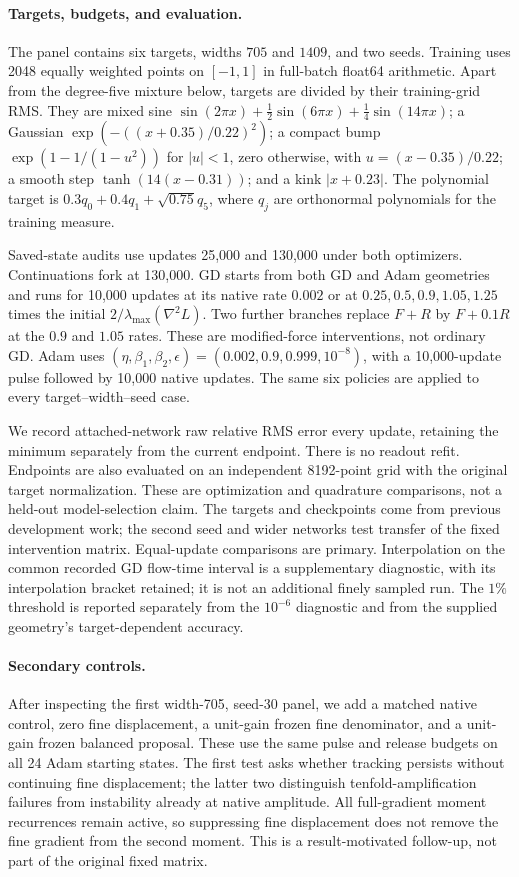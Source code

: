 \paragraph{Targets, budgets, and evaluation.}
The panel contains six targets, widths $705$ and $1409$, and two seeds.
Training uses 2048 equally weighted points on $[-1,1]$ in full-batch
float64 arithmetic. Apart from the degree-five mixture below, targets
are divided by their training-grid RMS. They are mixed sine
$\sin(2\pi x)+\tfrac12\sin(6\pi x)+\tfrac14\sin(14\pi x)$;
a Gaussian $\exp(-((x+0.35)/0.22)^2)$; a compact bump
$\exp(1-1/(1-u^2))$ for $|u|<1$, zero otherwise, with $u=(x-0.35)/0.22$;
a smooth step $\tanh(14(x-0.31))$; and a kink $|x+0.23|$.
The polynomial target is $0.3q_0+0.4q_1+\sqrt{0.75}q_5$, where $q_j$
are orthonormal polynomials for the training measure.

Saved-state audits use updates 25,000 and 130,000 under both optimizers.
Continuations fork at 130,000. GD starts from both GD and Adam geometries
and runs for 10,000 updates at its native rate $0.002$ or at
$0.25,0.5,0.9,1.05,1.25$ times the initial $2/\lambda_{\max}(\nabla^2L)$.
Two further branches replace $F+R$ by $F+0.1R$ at the $0.9$ and $1.05$
rates. These are modified-force interventions, not ordinary GD.
Adam uses $(\eta,\beta_1,\beta_2,\epsilon)=(0.002,0.9,0.999,10^{-8})$,
with a 10,000-update pulse followed by 10,000 native updates.
The same six policies are applied to every target--width--seed case.

We record attached-network raw relative RMS error every update, retaining
the minimum separately from the current endpoint. There is no readout
refit. Endpoints are also evaluated on an independent 8192-point grid
with the original target normalization. These are optimization and
quadrature comparisons, not a held-out model-selection claim. The targets
and checkpoints come from previous development work; the second seed
and wider networks test transfer of the fixed intervention matrix.
Equal-update comparisons are primary. Interpolation on the common recorded
GD flow-time interval is a supplementary diagnostic, with its interpolation
bracket retained; it is not an additional finely sampled run.
The $1\%$ threshold is reported separately from the $10^{-6}$ diagnostic
and from the supplied geometry's target-dependent accuracy.

\paragraph{Secondary controls.}
After inspecting the first width-705, seed-30 panel, we add a matched native
control, zero fine displacement, a unit-gain frozen fine denominator, and a
unit-gain frozen balanced proposal. These use the same pulse and release
budgets on all 24 Adam starting states. The first test asks whether tracking
persists without continuing fine displacement; the latter two distinguish
tenfold-amplification failures from instability already at native amplitude.
All full-gradient moment recurrences remain active, so suppressing fine
displacement does not remove the fine gradient from the second moment.
This is a result-motivated follow-up, not part of the original fixed matrix.

